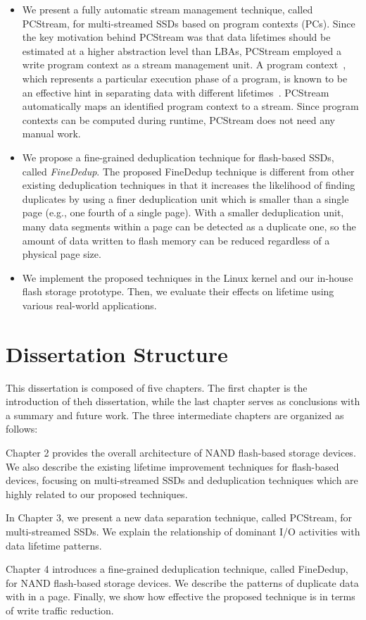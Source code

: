 \begin{itemize}
\item 
We present a fully automatic stream management technique, called \textsf{\small PCStream}, 
for multi-streamed SSDs based on program contexts (PCs).
Since the key motivation behind \textsf{\small PCStream} was 
that data lifetimes should be estimated at a higher abstraction level than LBAs, 
\textsf{\small PCStream} employed a write program context
as a stream management unit.
A program context~\cite{PC, PC2}, which represents a particular execution phase of a program, 
is known to be an effective hint in separating data with different lifetimes~\cite{PCHa}.  
\textsf{\small PCStream} automatically maps an identified program context to a stream.  
Since program contexts can be computed during runtime, 
\textsf{\small PCStream} does not need any manual work.   

\item
We propose a fine-grained deduplication technique for flash-based SSDs, called \textit{FineDedup}.
The proposed FineDedup technique is different from other existing deduplication techniques
in that it increases the likelihood of finding duplicates
by using a finer deduplication unit
which is smaller than a single page (e.g., one fourth of a single page).
With a smaller deduplication unit,
many data segments within a page can be detected as a duplicate one, 
so the amount of data written to flash memory can be reduced regardless of a physical page size.

\item
We implement the proposed techniques in the Linux kernel and our in-house flash storage
prototype. Then, we evaluate their effects on lifetime using various real-world applications.
 
\end{itemize}

\section{Dissertation Structure}
This dissertation is composed of five chapters. The first chapter is the introduction
of theh dissertation, while the last chapter serves as conclusions with a summary
and future work. The three intermediate chapters are organized as follows:

Chapter 2 provides the overall architecture of NAND flash-based storage devices.
We also describe the existing lifetime improvement techniques for flash-based devices,
focusing on multi-streamed SSDs and deduplication techniques which are highly related
to our proposed techniques.

In Chapter 3, we present a new data separation technique, called PCStream, 
for multi-streamed SSDs. We explain the relationship of dominant I/O activities
with data lifetime patterns. 

Chapter 4 introduces a fine-grained deduplication technique, called FineDedup, for NAND
flash-based storage devices. We describe the patterns of duplicate data with in a page.
Finally, we show how effective the proposed technique is in terms of write traffic reduction.

